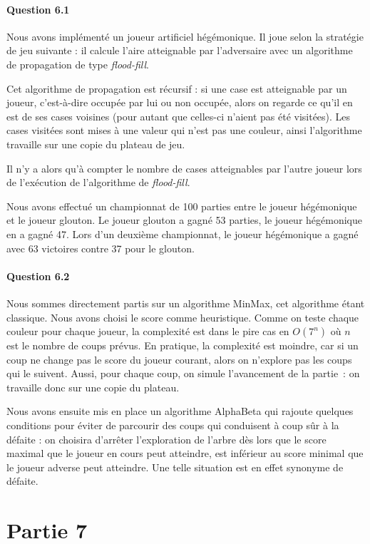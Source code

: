 \documentclass[a4paper]{article}
\begin{document}
    \paragraph{Question 6.1}
    Nous avons implémenté un joueur artificiel hégémonique. Il joue selon la 
stratégie de jeu suivante : il calcule l'aire atteignable par l'adversaire avec
un algorithme de propagation de type \emph{flood-fill}.

Cet algorithme de propagation est récursif : si une case est atteignable par un 
joueur, c'est-à-dire occupée par lui ou non occupée, alors on regarde ce qu'il 
en est de ses cases voisines (pour autant que celles-ci n'aient pas été 
visitées). Les cases visitées sont mises à une valeur qui n'est pas une 
couleur, ainsi l'algorithme travaille sur une copie du plateau de jeu.

Il n'y a alors qu'à compter le nombre de cases atteignables par l'autre joueur 
lors de l'exécution de l'algorithme de \emph{flood-fill}.

Nous avons effectué un championnat de 100 parties entre le joueur hégémonique 
et le joueur glouton. Le joueur glouton a gagné 53 parties, le joueur 
hégémonique en a gagné 47. Lors d'un deuxième championnat, le joueur 
hégémonique a gagné avec 63 victoires contre 37 pour le glouton.
    \paragraph{Question 6.2} Nous sommes directement partis sur un algorithme 
MinMax, cet algorithme étant classique. Nous avons choisi le score comme
    heuristique. Comme on teste chaque couleur pour chaque joueur, la complexité
    est dans le pire cas en $O(7^n)$ où $n$ est le nombre de coups prévus. En 
pratique, la complexité est moindre, car si un coup ne change pas le score du 
joueur courant, alors on n'explore pas les coups qui le suivent. 
Aussi, pour chaque coup, on simule l'avancement de la partie~: on travaille 
donc sur une copie du plateau. 

Nous avons ensuite mis en place un algorithme AlphaBeta qui rajoute quelques 
conditions pour éviter de parcourir des coups qui conduisent à coup sûr à la 
défaite : on choisira d'arrêter l'exploration de l'arbre dès lors que le score 
maximal que le joueur en cours peut atteindre, est inférieur au score minimal 
que le joueur adverse peut atteindre. Une telle situation est en effet synonyme 
de défaite.


    \section{Partie 7}
\end{document}

